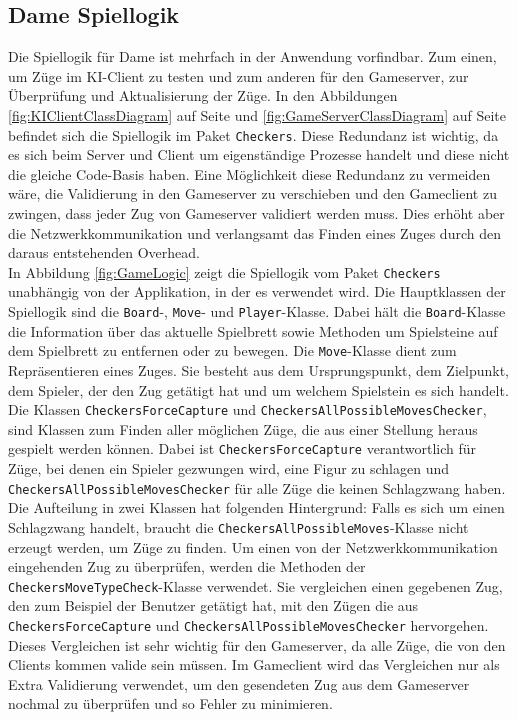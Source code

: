 \documentclass[12pt,a4paper,bibliography=totocnumbered,listof=totocnumbered]{article}
\begin{document}
\subsection{Dame Spiellogik}
\label{chap:Spiellogik}
Die Spiellogik für Dame ist mehrfach in der Anwendung vorfindbar. Zum einen, um Züge im KI-Client zu testen und zum anderen
für den Gameserver, zur Überprüfung und Aktualisierung der Züge. In den Abbildungen \ref{fig:KIClientClassDiagram} auf Seite \pageref{fig:KIClientClassDiagram} 
und \ref{fig:GameServerClassDiagram} auf Seite \pageref{fig:GameServerClassDiagram}
befindet sich die Spiellogik im Paket \texttt{Checkers}. Diese Redundanz ist wichtig, da es sich beim Server und Client um eigenständige Prozesse handelt 
und diese nicht die gleiche Code-Basis haben. Eine Möglichkeit diese Redundanz zu vermeiden wäre, die Validierung in den Gameserver zu verschieben und 
den Gameclient zu zwingen, dass jeder Zug von Gameserver validiert werden muss. Dies erhöht aber die Netzwerkkommunikation und verlangsamt das Finden eines Zuges 
durch den daraus entstehenden Overhead.
\\
In Abbildung \ref{fig:GameLogic} zeigt die Spiellogik vom Paket \texttt{Checkers} unabhängig von der Applikation, in der es verwendet wird.
Die Hauptklassen der Spiellogik sind die \texttt{Board}-, \texttt{Move}- und \texttt{Player}-Klasse. Dabei hält die \texttt{Board}-Klasse die Information über das aktuelle Spielbrett sowie 
Methoden um Spielsteine auf dem Spielbrett zu entfernen oder zu bewegen. 
Die \texttt{Move}-Klasse dient zum Repräsentieren eines Zuges. Sie besteht aus dem 
Ursprungspunkt, dem Zielpunkt, dem Spieler, der den Zug getätigt hat und um welchem Spielstein es sich handelt. 
\\
Die Klassen \texttt{CheckersForceCapture} und \texttt{CheckersAllPossibleMovesChecker}, sind Klassen zum Finden aller möglichen Züge, die aus einer Stellung heraus gespielt werden
können. Dabei ist \texttt{CheckersForceCapture} verantwortlich für Züge, bei denen ein Spieler gezwungen wird, eine Figur zu schlagen und \texttt{CheckersAllPossibleMovesChecker} 
für alle Züge die keinen Schlagzwang haben. Die Aufteilung in zwei Klassen hat folgenden Hintergrund: Falls es sich um einen Schlagzwang handelt, braucht 
die \texttt{CheckersAllPossibleMoves}-Klasse nicht erzeugt werden, um Züge zu finden. Um einen von der Netzwerkkommunikation eingehenden Zug zu überprüfen, 
werden die Methoden der \texttt{CheckersMoveTypeCheck}-Klasse verwendet. Sie vergleichen einen gegebenen Zug, 
den zum Beispiel der Benutzer getätigt hat, mit den Zügen die aus \texttt{CheckersForceCapture} und \texttt{CheckersAllPossibleMovesChecker}
hervorgehen. Dieses Vergleichen ist sehr wichtig für den Gameserver, da alle Züge, die von den Clients kommen valide sein müssen. Im Gameclient wird das Vergleichen nur 
als Extra Validierung verwendet, um den gesendeten Zug aus dem Gameserver nochmal zu überprüfen und so Fehler zu minimieren.
\\
\end{document}
